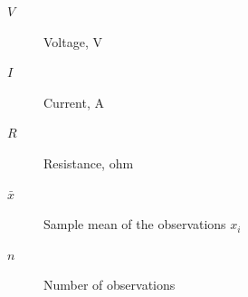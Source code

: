 \vskip 0.25cm
\baselineskip=1pc
\lineskip=1pc
\lineskiplimit=1pc
\begin{description}
  \item[$V$] Voltage, V
  \item[$I$] Current, A
  \item[$R$] Resistance, ohm
  \item[$\bar{x}$] Sample mean of the observations $x_i$
  \item[$n$] Number of observations
\end{description}
